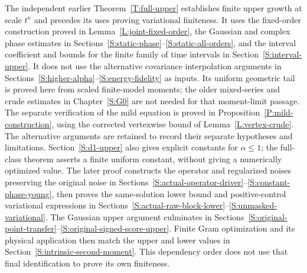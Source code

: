 \documentclass[12pt,oneside,openany]{book}
\numberwithin{equation}{section}
\theoremstyle{nogostyle}
\theoremstyle{definition}
\begin{document}
The independent earlier Theorem~\ref{T:full-upper} establishes finite upper
growth at scale $t^\kappa$ and precedes its uses proving variational finiteness.
It uses the fixed-order construction proved in Lemma~\ref{L:joint-fixed-order},
the Gaussian and complex phase estimates in
Sections~\ref{S:static-phase}--\ref{S:static-all-orders}, and the interval
coefficient and bounds for the finite family of time intervals in
Section~\ref{S:interval-upper}. It does not use the alternative covariance
interpolation arguments in
Sections~\ref{S:higher-alpha}--\ref{S:energy-fidelity} as inputs. Its uniform
geometric tail is proved here from scaled finite-model moments; the older
mixed-series and crude estimates in Chapter~\ref{S:G0} are not needed for that
moment-limit passage. The separate verification of the mild equation is proved
in Proposition~\ref{P:mild-construction}, using the corrected vertexwise bound
of Lemma~\ref{L:vertex-crude}. The alternative arguments are retained to record
their separate hypotheses and limitations. Section~\ref{S:d1-upper} also gives
explicit constants for $\alpha \le 1$; the full-class theorem asserts a finite
uniform constant, without giving a numerically optimized value. The later proof
constructs the operator and regularized noises preserving the original noise in
Sections~\ref{S:actual-operator-driver}--\ref{S:constant-phase-young}, then
proves the same-solution lower bound and positive-control variational
expressions in
Sections~\ref{S:actual-raw-block-lower}--\ref{S:unmasked-variational}. The
Gaussian upper argument culminates in
Sections~\ref{S:original-point-transfer}--\ref{S:original-signed-score-upper}.
Finite Gram optimization and its physical application then match the upper and
lower values in Section~\ref{S:intrinsic-second-moment}. This dependency order
does not use that final identification to prove its own finiteness.
\end{document}
